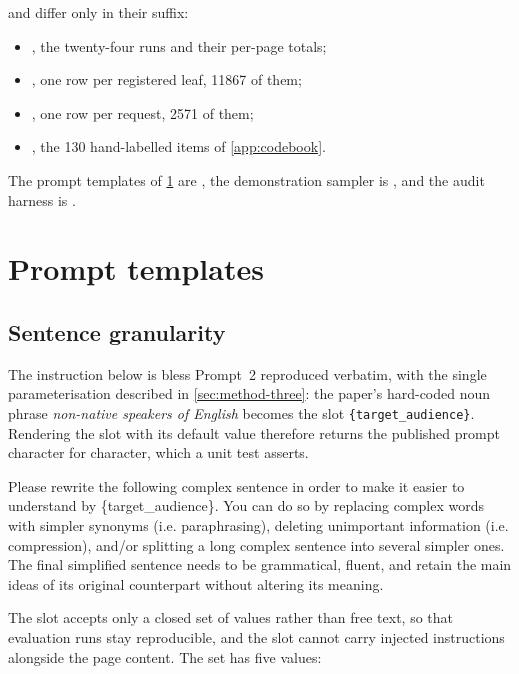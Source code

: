\noindent
and differ only in their suffix:

\begin{itemize}
	\setlength{\itemsep}{0pt}
	      \setlength{\parskip}{0pt}
	\item {}, the twenty-four runs and their per-page totals;
	\item {}, one row per registered leaf, \num{11867} of them;
	\item {}, one row per request, \num{2571} of them;
	\item {}, the \num{130} hand-labelled items of \cref{app:codebook}.
\end{itemize}

\noindent
The prompt templates of \cref{app:prompts} are , the demonstration sampler is , and the audit harness is .

\section{Prompt templates}
\label{app:prompts}

\subsection{Sentence granularity}

The instruction below is \gls{bless} Prompt~2 \parencite[13294]{kew-etal-2023-bless} reproduced verbatim, with the single parameterisation described in \cref{sec:method-three}: the paper's hard-coded noun phrase \emph{non-native speakers of English} becomes the slot \texttt{\{target\_audience\}}.
Rendering the slot with its default value therefore returns the published prompt character for character, which a unit test asserts.

\begin{promptbox}
	Please rewrite the following complex sentence in order to make it easier to understand by \{target\_audience\}. You can do so by replacing complex words with simpler synonyms (i.e. paraphrasing), deleting unimportant information (i.e. compression), and/or splitting a long complex sentence into several simpler ones. The final simplified sentence needs to be grammatical, fluent, and retain the main ideas of its original counterpart without altering its meaning.
\end{promptbox}

The slot accepts only a closed set of values rather than free text, so that evaluation runs stay reproducible, and the slot cannot carry injected instructions alongside the page content.
The set has five values:

